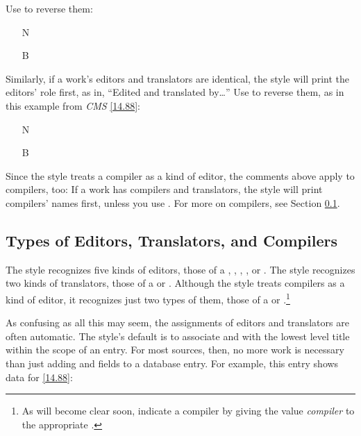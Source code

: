 \documentclass[11pt,letterpaper,oneside]{article}
\begin{document}
\noindent Use  to reverse them:

\begin{itemize}
\item[N] 

\item[B] 
\end{itemize}

Similarly, if a work's editors and translators are identical, the
style will print the editors' role first, as in, ``Edited and
translated by\ldots'' Use  to reverse them, as in this
example from \textit{CMS} \ref{14.88}:

\begin{itemize}
\item[N] 

\item[B] 
\end{itemize}

Since the style treats a compiler as a kind of editor, the comments
above apply to compilers, too: If a work has compilers and
translators, the style will print compilers' names first, unless you
use . For more on compilers, see Section
\ref{edtransnames}.

\subsection{Types of Editors, Translators, and Compilers}
\label{edtransnames}

The style recognizes five kinds of editors, those of a
, , ,
, or . The style recognizes two
kinds of translators, those of a  or
. Although the style treats compilers as a kind of
editor, it recognizes just two types of them, those of a
 or .\footnote{As will become
clear soon, indicate a compiler by giving the value \textit{compiler}
to the appropriate .}

As confusing as all this may seem, the assignments of editors and
translators are often automatic. The style's default is to associate
 and  with the lowest level
title within the scope of an entry. For most sources, then, no more
work is necessary than just adding  and
 fields to a database entry. For example, this
entry shows data for \ref{14.88}:
\end{document}
